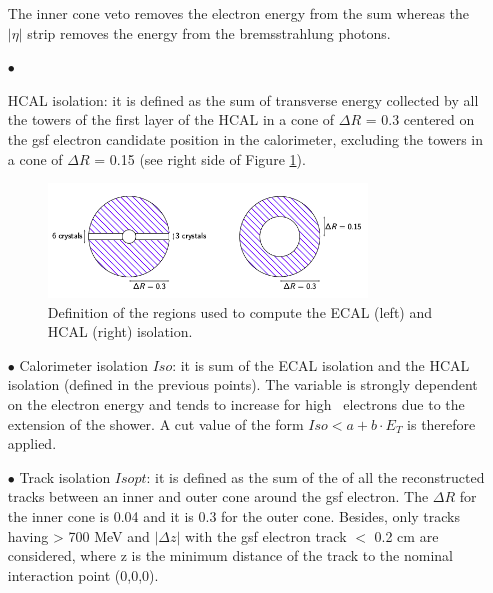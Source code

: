 \begin{itemize}
The inner cone veto removes the electron energy from the sum whereas the $|\eta|$ strip removes the energy from the bremsstrahlung photons.
\item[$\bullet$] { HCAL isolation: it is defined as the sum of transverse energy collected by all the towers
of the first layer of the HCAL in a cone of $\Delta R$ = 0.3 centered on the gsf electron
candidate position in the calorimeter, excluding the towers in a cone of $\Delta R$ = 0.15 (see right side of Figure \ref{iso_pic}).
\begin{figure}[!htbp]
\begin{center}
\includegraphics[width=0.8\textwidth]{figures/Zprime/iso.png}
\end{center}
\caption{Definition of the regions used to compute the ECAL (left) and HCAL (right) isolation.}
\label{iso_pic}
\end{figure}}

\item[$\bullet$] Calorimeter isolation $Iso$: it is sum of the ECAL isolation and the HCAL isolation (defined in the previous points). The variable is strongly dependent on the electron energy and tends to increase for high \et~electrons due to the extension of the shower. A cut value of the
form $Iso < a + b\cdot E_T$ is therefore applied.
\item[$\bullet$] Track \pt isolation $Isopt$: it is defined as the sum of the \pt of all the reconstructed
tracks between an inner and outer cone around the gsf electron. The $\Delta R$ for the inner cone is 0.04 and it is 0.3 for the outer cone.
Besides, only tracks having \pt > 700 MeV and $|\Delta z|$ with the gsf electron track $<$ 0.2 cm are considered, where z is the minimum distance of
the track to the nominal interaction point (0,0,0).
\end{itemize}
